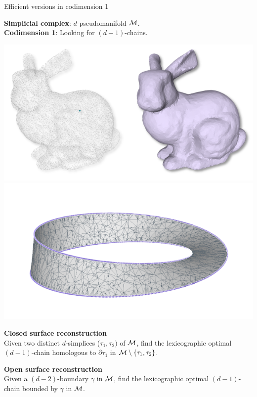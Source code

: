 \begin{frame}{Efficient versions in codimension 1}
\scriptsize

\textbf{Simplicial complex}: $d$-pseudomanifold $\mathcal{M}$.\\
\textbf{Codimension 1}: Looking for $(d-1)$-chains.
\vspace{0.2cm}

\pause

\includegraphics[width=0.47\linewidth]{applications/bunny}%
\hfill
\includegraphics[width=0.47\linewidth]{applications/mobius}
\vspace{0.2cm}

\begin{minipage}{0.47\linewidth}
\textbf{Closed surface reconstruction}\\
Given two distinct $d$-simplices ($\tau_1, \tau_2)$ of $\mathcal{M}$, find the lexicographic optimal $(d-1)$-chain homologous to $\partial\tau_1$ in $\mathcal{M} \setminus \{ \tau_1, \tau_2 \}$.
\end{minipage}%
\hfill
\begin{minipage}{0.47\linewidth}
\textbf{Open surface reconstruction}\\
Given a $(d-2)$-boundary $\gamma$ in $\mathcal{M}$, find the lexicographic optimal $(d-1)$-chain bounded by $\gamma$ in $\mathcal{M}$.
\end{minipage}
\end{frame}


